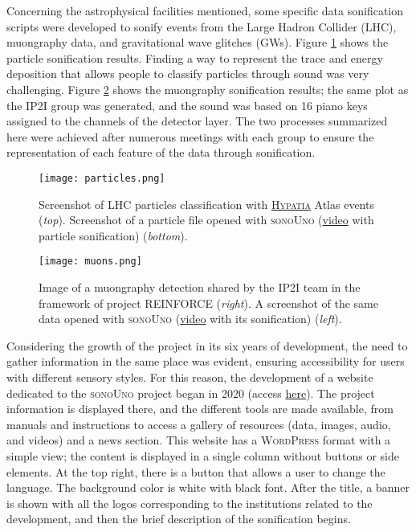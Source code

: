 \documentclass[baaa]{baaa}
\begin{document}
Concerning the astrophysical facilities mentioned, some specific data sonification scripts were developed to sonify events from the Large Hadron Collider (LHC), muongraphy data, and gravitational wave glitches (GWs). Figure \ref{fig:particle} shows the particle sonification results. Finding a way to represent the trace and energy deposition that allows people to classify particles through sound was very challenging. Figure \ref{fig:muons} shows the muongraphy sonification results; the same plot as the IP2I group was generated, and the sound was based on 16 piano keys assigned to the channels of the detector layer. The two processes summarized here were achieved after numerous meetings with each group to ensure the representation of each feature of the data through sonification.

\begin{figure}[!t]
\centering
    \texttt{[image: particles.png]}
    \caption{Screenshot of LHC particles classification with \href{https://hypatia-app.iasa.gr/Hypatia/?layout=cs2}{\textsc{Hypatia}} Atlas events (\emph{top}). Screenshot of a particle file opened with \textsc{sonoUno} (\href{https://www.youtube.com/watch?v=XMaYIJkJIHg&feature=youtu.be}{video} with particle sonification) (\emph{bottom}).}
    \label{fig:particle}
\end{figure}

\begin{figure}[!t]
\centering
    \texttt{[image: muons.png]}
    \caption{Image of a muongraphy detection shared by the IP2I team in the framework of project REINFORCE (\emph{right}). A screenshot of the same data opened with \textsc{sonoUno} (\href{https://www.youtube.com/watch?v=88nKeGJ9two&feature=youtu.be}{video} with its sonification) (\emph{left}).}
    \label{fig:muons}
\end{figure}

Considering the growth of the project in its six years of development, the need to gather information in the same place was evident, ensuring accessibility for users with different sensory styles. For this reason, the development of a website dedicated to the \textsc{sonoUno} project began in 2020 (access \href{https://www.sonouno.org.ar/}{here}). The project information is displayed there, and the different tools are made available, from manuals and instructions to access a gallery of resources (data, images, audio, and videos) and a news section. This website has a \textsc{WordPress} format with a simple view; the content is displayed in a single column without buttons or side elements. At the top right, there is a button that allows a user to change the language. The background color is white with black font. After the title, a banner is shown with all the logos corresponding to the institutions related to the development, and then the brief description of the sonification begins.
\end{document}
